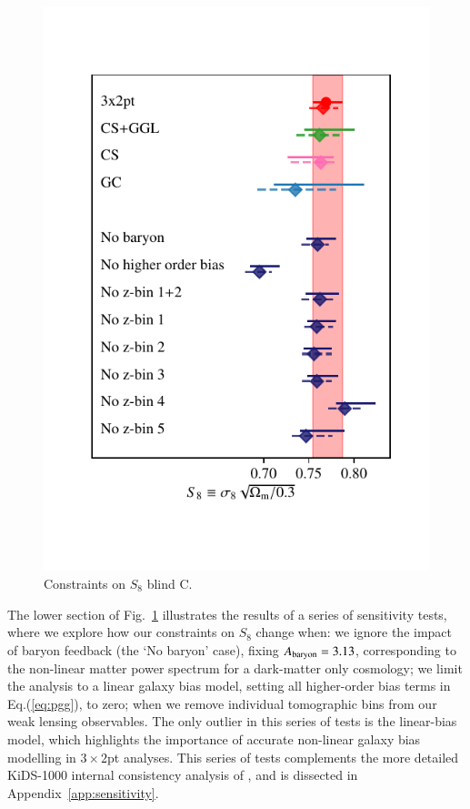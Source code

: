 \begin{figure}
	\begin{center}
		\includegraphics[width=\columnwidth]{Parameter_Plots/systematics/S8_comparison_blindC}
		\caption{Constraints on $S_{8}$ blind C. }
		\label{fig:S8comp}
	\end{center}
\end{figure}

The lower section of Fig.~\ref{fig:S8comp} illustrates the results of a series of sensitivity tests, where we explore how our constraints on $S_8$ change when: we ignore the impact of baryon feedback (the `No baryon' case), fixing $A_{\rm baryon}=3.13$, corresponding to the non-linear matter power spectrum for a dark-matter only cosmology; we limit the analysis to a linear galaxy bias model, setting all higher-order bias terms in Eq.(\ref{eq:pgg}), to zero; when we remove individual tomographic bins from our weak lensing observables.    The only outlier in this series of tests is the linear-bias model, which highlights the importance of accurate non-linear galaxy bias modelling in $3\times2$pt analyses.    This series of tests complements the more detailed KiDS-1000 internal consistency analysis of \citet{asgari/etal:inprep}, and is dissected in Appendix~\ref{app:sensitivity}.

